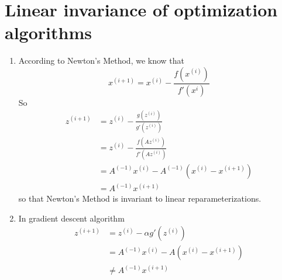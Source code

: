 \documentclass[12pt]{article}
\begin{document}
    \section*{ Linear invariance of optimization algorithms  }
    \begin{enumerate}[label=(\alph*)]
    
    \item
    
    According to Newton’s Method, we know that
    $$ x^{(i+1)} = x^{(i)} - \frac{f(x^{(i)})}{f'(x^{i})} $$
    So
    \begin{equation*} 
        \begin{split}
        z^{(i+1)} &= z^{(i)} - \frac{g(z^{(i)})}{g'(z^{(i)})} \\
                  &= z^{(i)} - \frac{f(Az^{(i)})}{f'(Az^{(i)})} \\
                  &= A^{(-1)}x^{(i)} - A^{(-1)}(x^{(i)}-x^{(i+1)}) \\
                  &= A^{(-1)}x^{(i+1)}
        \end{split}
    \end{equation*} 
    so that Newton’s Method is invariant to linear reparameterizations.

    \item
    In gradient descent algorithm
    \begin{equation*} 
        \begin{split}
        z^{(i+1)} &= z^{(i)} - \alpha g'(z^{(i)}) \\
                  &= A^{(-1)} x^{(i)} - A( x^{(i)} - x^{(i+1)} ) \\
                  &\neq A^{(-1)}x^{(i+1)}
        \end{split}
    \end{equation*} 

    \end{enumerate}  

    \newpage
\end{document}
